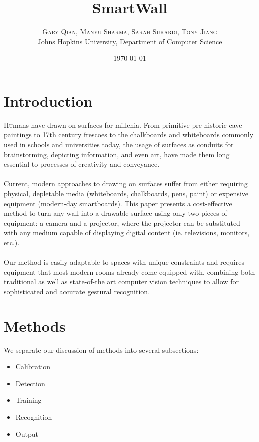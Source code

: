 \documentclass[twoside,twocolumn]{article}
\title{SmartWall} %
\author{%
\textsc{Gary Qian, Manyu Sharma, Sarah Sukardi, Tony Jiang}\\[1ex] %
\normalsize Johns Hopkins University, Department of Computer Science \\ %
}
\date{\today} %
\begin{document}
\maketitle


\section{Introduction}

\lettrine[nindent=0em,lines=3]{H} umans have drawn on surfaces for millenia. From primitive pre-historic cave paintings to 17th century frescoes to the chalkboards and whiteboards commonly used in schools and universities today, the usage of surfaces as conduits for brainstorming, depicting information, and even art, have made them long essential to processes of creativity and conveyance.\\ \\Current, modern approaches to drawing on surfaces suffer from either requiring physical, depletable media (whiteboards, chalkboards, pens, paint) or expensive equipment (modern-day smartboards). This paper presents a cost-effective method to turn any wall into a drawable surface using only two pieces of equipment: a camera and a projector, where the projector can be substituted with any medium capable of displaying digital content (ie. televisions, monitors, etc.). \\ \\ Our method is easily adaptable to spaces with unique constraints and requires equipment that most modern rooms already come equipped with, combining both traditional as well as state-of-the art computer vision techniques to allow for sophisticated and accurate gestural recognition.
\section{Methods}

We separate our discussion of methods into several subsections:
\begin{itemize}
\item Calibration
\item Detection
\item Training
\item Recognition
\item Output
\end{itemize}
\end{document}
